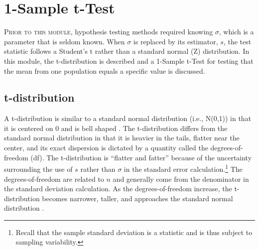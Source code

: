 \documentclass[10pt,openany]{book}\usepackage[]{graphicx}\usepackage[]{color}
\begin{document}
  \frontmatter
    

  \mainmatter


















\chapter{1-Sample t-Test} \label{chap:tTest1}

\minitoc
\vspace*{48pt}

\lettrine{P}{rior to this module}, hypothesis testing methods required knowing $\sigma$, which is a parameter that is seldom known. When $\sigma$ is replaced by its estimator, $s$, the test statistic follows a Student's t rather than a standard normal (Z) distribution. In this module, the t-distribution is described and a 1-Sample t-Test for testing that the mean from one population equals a specific value is discussed.

\vspace*{12pt}
\section{t-distribution}\label{sect:tDist}
A t-distribution is similar to a standard normal distribution (i.e., N(0,1)) in that it is centered on 0 and is bell shaped . The t-distribution differs from the standard normal distribution in that it is heavier in the tails, flatter near the center, and its exact dispersion is dictated by a quantity called the degrees-of-freedom (df). The t-distribution is ``flatter and fatter'' because of the uncertainty surrounding the use of $s$ rather than $\sigma$ in the standard error calculation.\footnote{Recall that the sample standard deviation is a statistic and is thus subject to sampling variability.} The degrees-of-freedom are related to $n$ and generally come from the denominator in the standard deviation calculation. As the degrees-of-freedom increase, the t-distribution becomes narrower, taller, and approaches the standard normal distribution .
\end{document}
